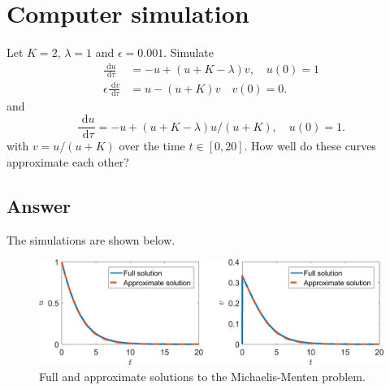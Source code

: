 \documentclass[]{article}
\newcommand{\bb}{\begin{equation}}
\newcommand{\ee}{\end{equation}}
\newcommand{\rd}{\text{ d}}
\begin{document}
\section{Computer simulation}
Let $K=2$, $\lambda=1$ and $\epsilon=0.001$. Simulate
\begin{align}
\frac{\rd u}{\rd \tau}&=-u+(u+K-\lambda)v, \quad u(0)=1\\
\epsilon\frac{\rd v}{\rd \tau}&=u-(u+K)v \quad v(0)=0.
\end{align}
and 
\bb
\frac{\rd u}{\rd \tau}=-u+(u+K-\lambda)u/(u+K),\quad u(0)=1.
\ee
with $v=u/(u+K)$ over the time $t\in[0,20]$. How well do these curves approximate each other?
\begin{Answ}
\subsection{Answer}
The simulations are shown below.
\begin{figure}[h!!!tb]
\centering
\includegraphics[width=\textwidth]{../../Pictures/Michaelis-Menten_approximation.png}
\caption{\label{Michaelis-Menten} Full and approximate solutions to the Michaelis-Menten problem.}
\end{figure}
\end{Answ}
\end{document}
